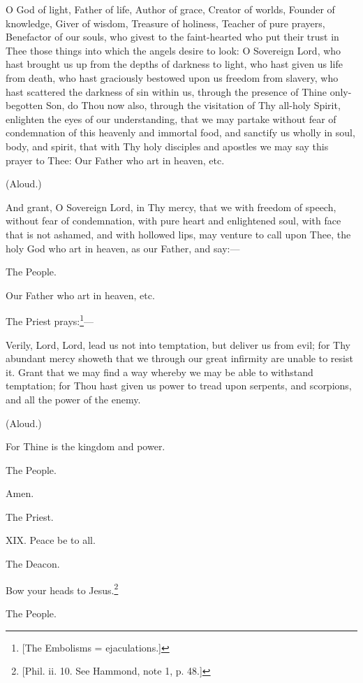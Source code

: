 O God of light, Father of life, Author of grace, Creator of worlds, Founder of knowledge, Giver of wisdom, Treasure of holiness, Teacher of pure prayers, Benefactor of our souls, who givest to the faint-hearted who put their trust in Thee those things into which the angels desire to look: O Sovereign Lord, who hast brought us up from the depths of darkness to light, who hast given us life from death, who hast graciously bestowed upon us freedom from slavery, who hast scattered the darkness of sin within us, through the presence of Thine only-begotten Son, do Thou now also, through the visitation of Thy all-holy Spirit, enlighten the eyes of our understanding, that we may partake without fear of condemnation of this heavenly and immortal food, and sanctify us wholly in soul, body, and spirit, that with Thy holy disciples and apostles we may say this prayer to Thee: Our Father who art in heaven, etc.

(Aloud.)

And grant, O Sovereign Lord, in Thy mercy, that we with freedom of speech, without fear of condemnation, with pure heart and enlightened soul, with face that is not ashamed, and with hollowed lips, may venture to call upon Thee, the holy God who art in heaven, as our Father, and say:—

The People.

Our Father who art in heaven, etc.

The Priest prays:\footnote{\par{}  [The Embolisms = ejaculations.]}—

Verily, Lord, Lord, lead us not into temptation, but deliver us from evil; for Thy abundant mercy showeth that we through our great infirmity are unable to resist it. Grant that we may find a way whereby we may be able to withstand temptation; for Thou hast given us power to tread upon serpents, and scorpions, and all the power of the enemy.

(Aloud.)

For Thine is the kingdom and power.

The People.

Amen.

The Priest.

XIX. Peace be to all.

The Deacon.

Bow your heads to Jesus.\footnote{\par{}  [Phil. ii. 10. See Hammond, note 1, p. 48.]}

The People.

